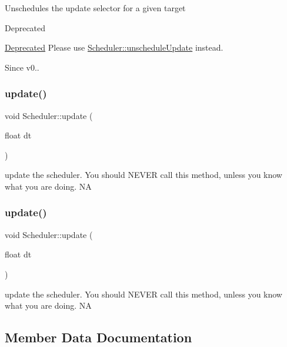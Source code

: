Unschedules the update selector for a given target \begin{DoxyRefDesc}{Deprecated}
\item[\hyperlink{deprecated__deprecated000294}{Deprecated}]Please use \textquotesingle{}\hyperlink{classScheduler_acc7bc87cc441a0f826c2a6758a9adcad}{Scheduler\+::unschedule\+Update}\textquotesingle{} instead. \end{DoxyRefDesc}
\begin{DoxySince}{Since}
v0.. 
\end{DoxySince}
\mbox{\label{classScheduler_a533ad6047192a10444e2f4d386f3766a}} 
\subsubsection{\texorpdfstring{update()}{update()}\hspace{0.1cm}{\footnotesize\ttfamily [1/2]}}
{\footnotesize\ttfamily void Scheduler\+::update (\begin{DoxyParamCaption}\item[{float}]{dt }\end{DoxyParamCaption})}

\textquotesingle{}update\textquotesingle{} the scheduler. You should N\+E\+V\+ER call this method, unless you know what you are doing.  NA \mbox{\label{classScheduler_a533ad6047192a10444e2f4d386f3766a}} 
\subsubsection{\texorpdfstring{update()}{update()}\hspace{0.1cm}{\footnotesize\ttfamily [2/2]}}
{\footnotesize\ttfamily void Scheduler\+::update (\begin{DoxyParamCaption}\item[{float}]{dt }\end{DoxyParamCaption})}

\textquotesingle{}update\textquotesingle{} the scheduler. You should N\+E\+V\+ER call this method, unless you know what you are doing.  NA 

\subsection{Member Data Documentation}
\mbox{\label{classScheduler_aff5f555d99f98484e7b7f46450089460}} 
